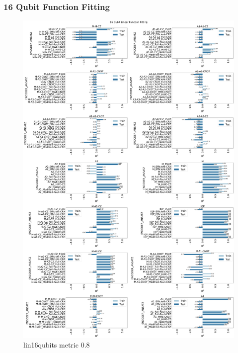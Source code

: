 \documentclass[journal=jacsat,manuscript=article]{achemso}
\begin{document}
\subsubsection{16 Qubit Function Fitting}
\begin{figure}[H]
	\centering
	\includegraphics[width=0.8\linewidth]{images/16qubit_Linear_funcfit_R2.png}
	\caption{lin16qubits metric 0.8}
	\label{fig:lin16qubits_metric}
\end{figure}
\end{document}
